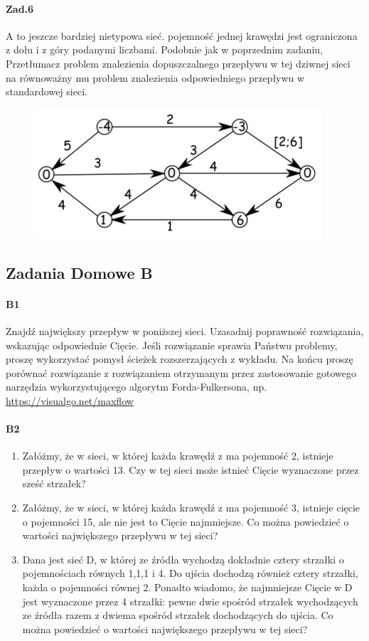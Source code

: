 \paragraph{Zad.6} A to jeszcze bardziej nietypowa sieć. pojemność jednej krawędzi jest ograniczona z dołu i z góry podanymi liczbami. Podobnie jak w poprzednim zadaniu, Przetłumacz problem znalezienia dopuszczalnego przepływu w tej dziwnej sieci na równoważny mu problem znalezienia odpowiedniego przepływu w standardowej sieci.
\begin{figure}[H]
\centering
\includegraphics[width=.8\textwidth]{img/6_Z6}
\end{figure}

\subsection{Zadania Domowe B}
\paragraph{B1} Znajdź największy przepływ w poniższej sieci. Uzasadnij poprawność rozwiązania, wskazując odpowiednie Cięcie.
Jeśli rozwiązanie sprawia Państwu problemy, proszę  wykorzystać pomysł ścieżek rozszerzających z wykładu.
Na końcu proszę porównać rozwiązanie z rozwiązaniem otrzymanym przez zastosowanie gotowego narzędzia wykorzystującego algorytm Forda-Fulkersona, np. \url{https://visualgo.net/maxflow}

\paragraph{B2}
\begin{enumerate}[label=\alph*)]
\item Załóżmy, że w sieci, w której każda krawędź z ma pojemność 2, istnieje przepływ o wartości 13. Czy w tej sieci może istnieć Cięcie wyznaczone przez sześć strzałek?
\item Załóżmy, że w sieci, w której każda krawędź z ma pojemność 3, istnieje cięcie o pojemności 15, ale nie jest to Cięcie najmniejsze. Co można powiedzieć o wartości największego przepływu w tej sieci?
\item Dana jest sieć D, w której ze źródła wychodzą dokładnie cztery strzałki o pojemnościach równych 1,1,1 i 4. Do ujścia dochodzą również cztery strzałki, każda o pojemności równej 2. Ponadto wiadomo, że najmniejsze Cięcie w D jest wyznaczone przez 4 strzałki: pewne dwie spośród strzałek wychodzących ze źródła razem z dwiema spośród strzałek dochodzących do ujścia.
Co można powiedzieć o wartości największego przepływu w tej sieci?
\end{enumerate}

